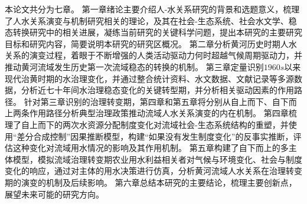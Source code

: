 本论文共分为七章。
第一章绪论主要介绍人-水关系研究的背景和选题意义，梳理了人水关系演变与机制研究相关的理论，及其在社会-生态系统、社会水文学、稳态转换研究中的相关进展，凝练当前研究的关键科学问题，提出本研究的主要研究目标和研究内容，简要说明本研究的研究区概况。
第二章分析黄河历史时期人水关系的演变过程，着眼于不断增强的人类活动驱动力何时超越气候周期驱动力，并推动黄河流域发生历史第一次流域稳态的转换的机制。
第三章定量识别$1960s$以来现代治黄时期的水治理变化，并通过整合统计资料、水文数据、文献记录等多源数据，分析近七十年间水治理稳态变化的关键转型期，并分析相关驱动因素的作用路径。
针对第三章识别的治理转变期，第四章和第五章将分别从自上而下、自下而上两条作用路径分析典型治理政策推动流域人水关系演变的内在机制。
第四章梳理了自上而下的两次水资源分配制度变化对流域社会-生态系统结构的重塑，并使用“差分合成控制”因果推断模型，构建“如果没有发生制度变化”的反事实推断，评估这种变化对流域用水情况的影响及其作用机制。
第五章构建了自下而上的多主体模型，模拟流域治理转变期农业用水利益相关者对气候与环境变化、社会与制度变化的响应，通过对主体的用水决策进行仿真，分析黄河流域人水关系在治理转变期的演变的机制及后续影响。
第六章总结本研究的主要结论，梳理主要创新点，展望未来可能的研究方向。